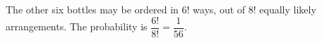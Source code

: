 The other six bottles may be ordered in $6!$ ways, out of $8!$ equally likely arrangements. The probability is $\dfrac{6!}{8!}=\boxed{\dfrac{1}{56}}$.
